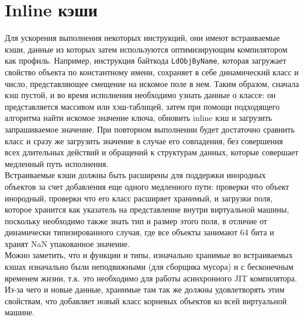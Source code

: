 \documentclass[times,specification,annotation]{itmo-student-thesis}
\begin{document}
\section{Inline кэши}
Для ускорения выполнения некоторых инструкций, они имеют встраиваемые кэши, данные из которых затем используются оптимизирующим компилятором как профиль. Например, инструкция байткода \texttt{LdObjByName}, которая загружает свойство объекта по константному имени, сохраняет в себе динамический класс и число, представляющее смещение на искомое поле в нем. Таким образом, сначала кэш пустой, и во время исполнения необходимо узнать данные о классе: он представляется массивом или хэш-таблицей, затем при помощи подходящего алгоритма найти искомое значение ключа, обновить inline кэш и загрузить запрашиваемое значение. При повторном выполнении будет достаточно сравнить класс и сразу же загрузить значение в случае его совпадения, без совершения всех длительных действий и обращений к структурам данных, которые совершает медленный путь исполнения.\\
Встраиваемые кэши должны быть расширены для поддержки инородных объектов за счет добавления еще одного медленного пути: проверки что объект инородный, проверки что его класс расширяет хранимый, и загрузки поля, которое хранится как указатель на представление внутри виртуальной машины, поскольку необходимо также знать тип и размер этого поля, в отличие от динамически типизированного случая, где все объекты занимают 64 бита и хранят NaN упакованное значение.\\
Можно заметить, что и функции и типы, изначально хранимые во встраиваемых кэшах изначально были неподвижными (для сборщика мусора) и с бесконечным временем жизни, т.к. это необходимо для работы асинхронного JIT компилятора. Из-за чего и новые данные, хранимые там так же должны удовлетворять этим свойствам, что добавляет новый класс корневых объектов ко всей виртуальной машине.
\end{document}
